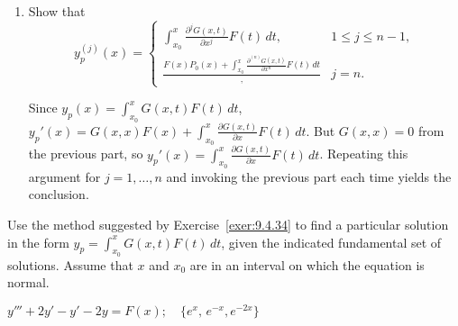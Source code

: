 \documentclass{ximera}
\begin{document}
\begin{problem}
\begin{enumerate}
\item %
Show that
$$
 y_p^{(j)}(x)=\left\{\begin{array}{cl}\int_{x_0}^x
\frac{\partial^{j}G(x,t)}{\partial x^j}F(t)\,dt,&1\le j\le n-1,\\
\frac{{F(x)}{P_0(x)}+
\int_{x_0}^x\frac{\partial^{(n)}G(x,t)}{\partial x^n}F(t)\,dt},&j=n.
\end{array}\right.
$$

\begin{solution}
Since
$y_p(x)=\int_{x_0}^x G(x,t)F(t)\,dt$,
$y_p'(x)=G(x,x)F(x)+\int_{x_0}^x\frac{\partial
G(x,t)}{\partial x}F(t)\,dt$. But $G(x,x)=0$ from the previous part, so
$y_p'(x)=\int_{x_0}^x\frac{\partial
G(x,t)}{\partial x}F(t)\,dt$. Repeating this argument for
$j=1,\dots,n$ and invoking the previous part each time yields the conclusion.
\end{solution}
\end{enumerate}
\end{problem}


\begin{problem}\label{exer:9.4.35}
Use the method suggested by Exercise~\ref{exer:9.4.34} to find a particular solution in the form
$y_p=\int_{x_0}^x G(x,t)F(t)\,dt$, given the indicated fundamental set of solutions.  Assume that $x$ and $x_0$ are in an interval on which
the equation is normal.

$y'''+2y'-y'-2y=F(x); \quad \{e^x,\,e^{-x},e^{-2x}\}$
\end{problem}
\end{document}
